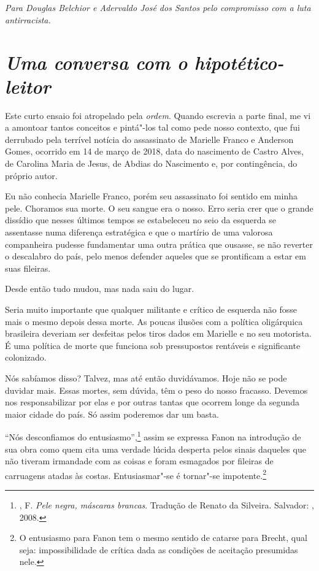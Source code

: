 \chapter*{}

\vfill
\begin{flushright}
\emph{Para Douglas Belchior e Adervaldo José dos Santos pelo compromisso
com a luta antirracista.}
\end{flushright}
\thispagestyle{empty}

\chapter{\emph{Uma conversa com o hipotético-leitor}}

Este curto ensaio foi atropelado pela \emph{ordem}. Quando escrevia a
parte final, me vi a amontoar tantos conceitos e pintá"-los tal como pede
nosso contexto, que fui derrubado pela terrível notícia do assassinato
de Marielle Franco e Anderson Gomes, ocorrido em 14 de março de 2018,
data do nascimento de Castro Alves, de Carolina Maria de Jesus, de
Abdias do Nascimento e, por contingência, do próprio autor.

Eu não conhecia Marielle Franco, porém seu assassinato foi sentido em
minha pele. Choramos sua morte. O seu sangue era o nosso. Erro seria
crer que o grande dissídio que nesses últimos tempos se estabeleceu no
seio da esquerda se assentasse numa diferença estratégica e que o
martírio de uma valorosa companheira pudesse fundamentar uma outra
prática que ousasse, se não reverter o descalabro do país, pelo menos
defender aqueles que se prontificam a estar em suas fileiras.

Desde então tudo mudou, mas nada saiu do lugar.

Seria muito importante que qualquer militante e crítico de esquerda não
fosse mais o mesmo depois dessa morte. As poucas ilusões com a política
oligárquica brasileira deveriam ser desfeitas pelos tiros dados em
Marielle e no seu motorista. É uma política de morte que funciona sob
pressupostos rentáveis e significante colonizado.

Nós sabíamos disso? Talvez, mas até então duvidávamos. Hoje não se pode
duvidar mais. Essas mortes, sem dúvida, têm o peso do nosso fracasso.
Devemos nos responsabilizar por elas e por outras tantas que ocorrem
longe da segunda maior cidade do país. Só assim poderemos dar um basta.

``Nós desconfiamos do entusiasmo'',\footnote{, F. \emph{Pele negra,
  máscaras brancas}. Tradução de Renato da Silveira. Salvador: ,
  2008.} assim se expressa Fanon na introdução de sua obra como quem
cita uma verdade lúcida desperta pelos sinais daqueles que não tiveram
irmandade com as coisas e foram esmagados por fileiras de carruagens
atadas às costas. Entusiasmar"-se é tornar"-se impotente.\footnote{O
  entusiasmo para Fanon tem o mesmo sentido de catarse para Brecht, qual
  seja: impossibilidade de crítica dada as condições de aceitação
  presumidas nele.}

